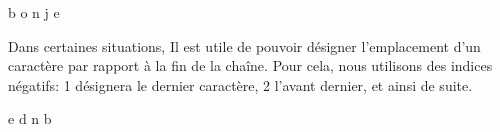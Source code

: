 \documentclass[letterpaper,10pt,french]{sphinxmanual}
\begin{document}
\begin{sphinxVerbatim}[commandchars=\\\{\}]
  

\PYG{p}{[}\PYG{p}{]}

\PYG{p}{[}\PYG{p}{]}

\PYG{p}{[}\PYG{p}{]}

\PYG{p}{[}\PYG{p}{]}

\PYG{p}{[}\PYG{p}{]}
\end{sphinxVerbatim}

\begin{sphinxVerbatim}[commandchars=\\\{\}]
b
o
n
j
e
\end{sphinxVerbatim}

\sphinxAtStartPar
Dans certaines situations, Il est utile de pouvoir désigner l’emplacement d’un caractère par rapport à la fin de la chaîne.
Pour cela, nous utilisons des indices négatifs: \sphinxhyphen{}1 désignera le dernier caractère, \sphinxhyphen{}2 l’avant dernier, et ainsi de suite.

\begin{sphinxVerbatim}[commandchars=\\\{\}]
  

\PYG{p}{[}\PYG{p}{]}

\PYG{p}{[}\PYG{p}{]}

\PYG{p}{[}\PYG{p}{]}

\PYG{p}{[}\PYG{p}{]}
\end{sphinxVerbatim}

\begin{sphinxVerbatim}[commandchars=\\\{\}]
e
d
n
b
\end{sphinxVerbatim}
\end{document}
